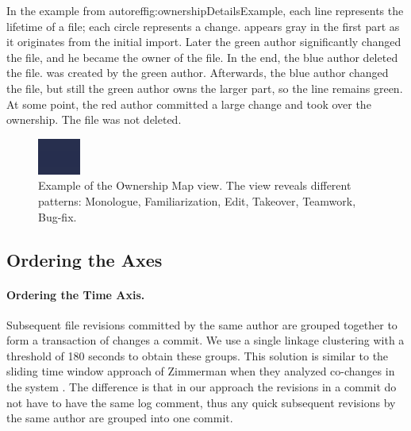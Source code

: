 In the example from autoref{fig:ownershipDetailsExample}, each line represents the lifetime of a file; each circle represents a change.  appears gray in the first part as it originates from the initial import. Later the green author significantly changed the file, and he became the owner of the file. In the end, the blue author deleted the file.  was created by the green author. Afterwards, the blue author changed the file, but still the green author owns the larger part, so the line remains green. At some point, the red author committed a large change and took over the ownership. The file was not deleted.

\begin{figure}[hbt]
\begin{center}
\includegraphics{owners-map-example}
\caption{Example of the Ownership Map view. The view reveals different patterns:
Monologue, Familiarization, Edit, Takeover, Teamwork, Bug-fix.}
\label{fig:ownershipMapExample}
\end{center}
\end{figure}

\subsection{Ordering the Axes}

\paragraph{Ordering the Time Axis.}
Subsequent file revisions committed by the same author are grouped together to form a transaction of changes \ie a commit. We use a single linkage clustering with a threshold of 180 seconds to obtain these groups. This solution is similar to the sliding time window approach of Zimmerman \etal when they analyzed co-changes in the system \cite{Zimm04a}. The difference is that in our approach the revisions in a commit do not have to have the same log comment, thus any quick subsequent revisions by the same author are grouped into one commit.


